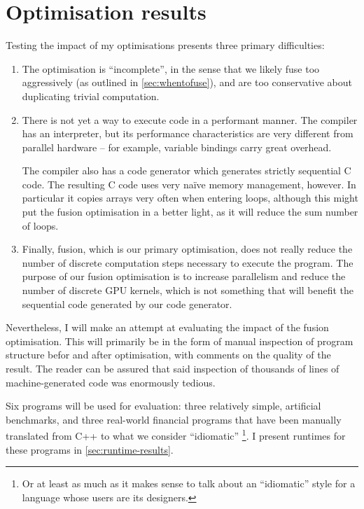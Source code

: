 \chapter{Optimisation results}
\label{chap:optimisation-results}

Testing the impact of my optimisations presents three primary
difficulties:

\begin{enumerate}
\item The optimisation is ``incomplete'', in the sense that we likely
  fuse too aggressively (as outlined in \cref{sec:whentofuse}), and
  are too conservative about duplicating trivial computation.

\item There is not yet a way to execute \LO{} code in a performant
  manner.  The \LO{} compiler has an interpreter, but its performance
  characteristics are very different from parallel hardware -- for
  example, variable bindings carry great overhead.

  The compiler also has a code generator which generates strictly
  sequential C code.  The resulting C code uses very naïve memory
  management, however.  In particular it copies arrays very often when
  entering loops, although this might put the fusion optimisation in a
  better light, as it will reduce the sum number of loops.

\item Finally, fusion, which is our primary optimisation, does not
  really reduce the number of discrete computation steps necessary to
  execute the program.  The purpose of our fusion optimisation is to
  increase parallelism and reduce the number of discrete GPU kernels,
  which is not something that will benefit the sequential code
  generated by our code generator.
\end{enumerate}

Nevertheless, I will make an attempt at evaluating the impact of the
fusion optimisation.  This will primarily be in the form of manual
inspection of program structure befor and after optimisation, with
comments on the quality of the result.  The reader can be assured that
said inspection of thousands of lines of machine-generated code was
enormously tedious.

Six programs will be used for evaluation: three relatively simple,
artificial benchmarks, and three real-world financial programs that
have been manually translated from C++ to what we consider
``idiomatic'' \LO{}\footnote{Or at least as much as it makes sense to
  talk about an ``idiomatic'' style for a language whose users are its
  designers.}.  I present runtimes for these programs in
\cref{sec:runtime-results}.

